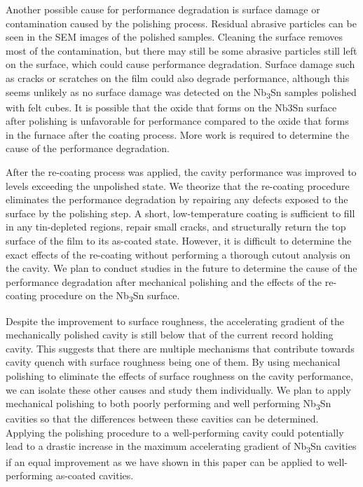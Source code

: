 \documentclass[reprint,amsmath,amssymb,aps]{revtex4-2}%
\begin{document}
Another possible cause for performance degradation is surface damage or contamination caused by the polishing process. Residual abrasive particles can be seen in the SEM images of the polished samples. Cleaning the surface removes most of the contamination, but there may still be some abrasive particles still left on the surface, which could cause performance degradation. Surface damage such as cracks or scratches on the film could also degrade performance, although this seems unlikely as no surface damage was detected on the Nb\textsubscript{3}Sn samples polished with felt cubes. It is possible that the oxide that forms on the Nb3Sn surface after polishing is unfavorable for performance compared to the oxide that forms in the furnace after the coating process. More work is required to determine the cause of the performance degradation. 

After the re-coating process was applied, the cavity performance was improved to levels exceeding the unpolished state. We theorize that the re-coating procedure eliminates the performance degradation by repairing any defects exposed to the surface by the polishing step. A short, low-temperature coating is sufficient to fill in any tin-depleted regions, repair small cracks, and structurally return the top surface of the film to its as-coated state. However, it is difficult to determine the exact effects of the re-coating without performing a thorough cutout analysis on the cavity. We plan to conduct studies in the future to determine the cause of the performance degradation after mechanical polishing and the effects of the re-coating procedure on the Nb\textsubscript{3}Sn surface.

Despite the improvement to surface roughness, the accelerating gradient of the mechanically polished cavity is still below that of the current record holding cavity.\cite{posen2021advances} This suggests that there are multiple mechanisms that contribute towards cavity quench with surface roughness being one of them. By using mechanical polishing to eliminate the effects of surface roughness on the cavity performance, we can isolate these other causes and study them individually. We plan to apply mechanical polishing to both poorly performing and well performing Nb\textsubscript{3}Sn cavities so that the differences between these cavities can be determined. Applying the polishing procedure to a well-performing cavity could potentially lead to a drastic increase in the maximum accelerating gradient of Nb\textsubscript{3}Sn cavities if an equal improvement as we have shown in this paper can be applied to well-performing as-coated cavities.
\end{document}
